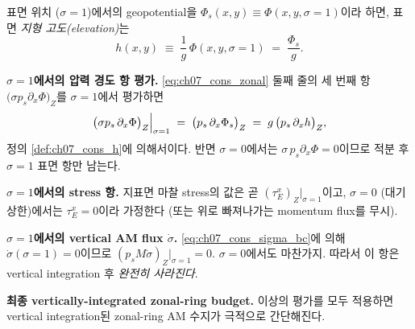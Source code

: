 
\begin{definition}\label{def:ch07_cons_h}
표면 위치 ($\sigma=1$)에서의 geopotential을 $\Phi_s(x,y) \equiv
\Phi(x,y,\sigma=1)$이라 하면, 표면 \emph{지형 고도(elevation)}는
\begin{equation}\label{eq:ch07_cons_h_def}
  h(x,y) \;\equiv\; \frac{1}{g}\,\Phi(x,y,\sigma=1)
  \;=\; \frac{\Phi_s}{g}.
\end{equation}
\end{definition}

\medskip



\noindent\textbf{$\sigma=1$에서의 압력 경도 항 평가.}
\eqref{eq:ch07_cons_zonal} 둘째 줄의 세 번째 항 $\bigl(\sigma p_s
\partial_x\Phi\bigr)_Z$를 $\sigma=1$에서 평가하면
\[
  \Bigl.\bigl(\sigma p_s\,\partial_x\Phi\bigr)_Z\Bigr|_{\sigma=1}
  \;=\;
  \bigl(p_s\,\partial_x\Phi_s\bigr)_Z
  \;=\;
  g\,\bigl(p_s\,\partial_x h\bigr)_Z,
\]
정의 \ref{def:ch07_cons_h}에 의해서이다.  반면 $\sigma=0$에서는
$\sigma\,p_s\partial_x\Phi = 0$이므로 적분 후 $\sigma=1$ 표면 항만 남는다.

\medskip



\noindent\textbf{$\sigma=1$에서의 stress 항.}
지표면 마찰 stress의 값은 곧 $(\tau_E^x)_Z|_{\sigma=1}$이고, $\sigma=0$
(대기 상한)에서는 $\tau_E^x = 0$이라 가정한다 (또는 위로 빠져나가는 momentum
flux를 무시).

\medskip



\noindent\textbf{$\sigma=1$에서의 vertical AM flux $\dot\sigma$.}
\eqref{eq:ch07_cons_sigma_bc}에 의해 $\dot\sigma(\sigma=1)=0$이므로
$(p_s M\dot\sigma)_Z\big|_{\sigma=1} = 0$.  $\sigma=0$에서도 마찬가지.
따라서 이 항은 vertical integration 후 \emph{완전히 사라진다}.

\medskip



\noindent\textbf{최종 vertically-integrated zonal-ring budget.}
이상의 평가를 모두 적용하면 vertical integration된 zonal-ring AM 수지가
극적으로 간단해진다.

